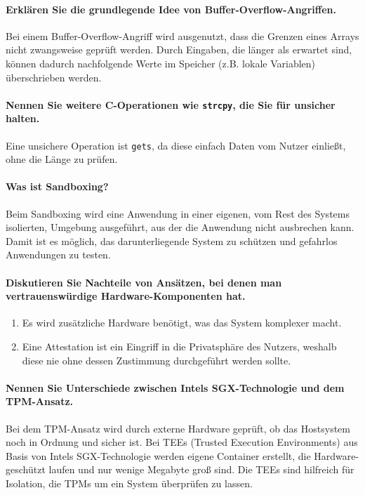 \documentclass[a4paper, 11pt, accentcolor = tud3b]{tudreport}
\begin{document}
			\paragraph{Erklären Sie die grundlegende Idee von Buffer-Overflow-Angriffen.}
			Bei einem Buffer-Overflow-Angriff wird ausgenutzt, dass die Grenzen eines Arrays nicht zwangsweise geprüft werden. Durch Eingaben, die länger als erwartet sind, können dadurch nachfolgende Werte im Speicher (z.B. lokale Variablen) überschrieben werden.
			
			\paragraph{Nennen Sie weitere C-Operationen wie \texttt{strcpy}, die Sie für unsicher halten.}
			Eine unsichere Operation ist \texttt{gets}, da diese einfach Daten vom Nutzer einließt, ohne die Länge zu prüfen.
			
			\paragraph{Was ist Sandboxing?}
			Beim Sandboxing wird eine Anwendung in einer eigenen, vom Rest des Systems isolierten, Umgebung ausgeführt, aus der die Anwendung nicht ausbrechen kann. Damit ist es möglich, das darunterliegende System zu schützen und gefahrlos Anwendungen zu testen.
			
			\paragraph{Diskutieren Sie Nachteile von Ansätzen, bei denen man vertrauenswürdige Hardware-Komponenten hat.}
			\begin{enumerate}
				\item Es wird zusätzliche Hardware benötigt, was das System komplexer macht.
				\item Eine Attestation ist ein Eingriff in die Privatsphäre des Nutzers, weshalb diese nie ohne dessen Zustimmung durchgeführt werden sollte.
			\end{enumerate}
			
			\paragraph{Nennen Sie Unterschiede zwischen Intels SGX-Technologie und dem TPM-Ansatz.}
			Bei dem TPM-Ansatz wird durch externe Hardware geprüft, ob das Hostsystem noch in Ordnung und sicher ist. Bei TEEs (Trusted Execution Environments) aus Basis von Intels SGX-Technologie werden eigene Container erstellt, die Hardware-geschützt laufen und nur wenige Megabyte groß sind. Die TEEs sind hilfreich für Isolation, die TPMs um ein System überprüfen zu lassen.
\end{document}
